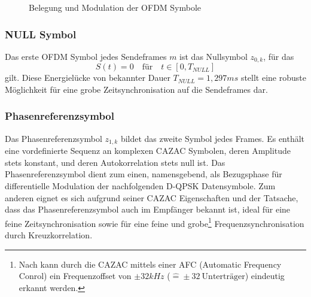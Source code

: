 \begin{figure}[htb]
\begin{center}
\end{center}
\caption{Belegung und Modulation der OFDM Symbole}
\label{chart:t_frame}
\end{figure}


\subsubsection{NULL Symbol}
Das erste OFDM Symbol jedes Sendeframes $m$ ist das Nullsymbol $z_{0,k}$, für das
\begin{equation}
S(t) = 0 \quad \text{für} \quad t \in [0, T_{NULL}]
\end{equation}
gilt. Diese Energielücke von bekannter Dauer $T_{NULL} = 1,297ms$ stellt eine robuste Möglichkeit für eine grobe Zeitsynchronisation auf die Sendeframes dar.

\subsubsection{Phasenreferenzsymbol}
\label{sec:phasenreferenzsymbol}
Das Phasenreferenzsymbol $z_{1,k}$ bildet das zweite Symbol jedes Frames. Es enthält eine vordefinierte Sequenz an komplexen \ac{CAZAC} Symbolen, deren Amplitude stets konstant, und deren Autokorrelation stets null ist. Das Phasenreferenzsymbol dient zum einen, namensgebend, als Bezugsphase für differentielle Modulation der nachfolgenden D-QPSK Datensymbole. Zum anderen eignet es sich aufgrund seiner \ac{CAZAC} Eigenschaften und der Tatsache, dass das Phasenreferenzsymbol auch im Empfänger bekannt ist, ideal für eine feine Zeitsynchronisation sowie für eine feine und grobe\footnote{Nach \cite{dab_buch} kann durch die CAZAC mittels einer AFC (Automatic Frequency Conrol) ein Frequenzoffset von $\pm 32kHz$ ($\hat{=} \pm 32 \: \text{Unterträger}$) eindeutig erkannt werden.} Frequenzsynchronisation durch Kreuzkorrelation.

